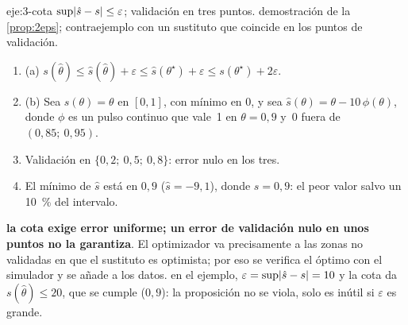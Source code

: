 \begin{solucion}{eje:3-cota}
\datos $\sup\lvert\hat s-s\rvert\le\varepsilon$; validación en tres puntos.
\planteamiento demostración de la \cref{prop:2eps}; contraejemplo con un sustituto que coincide en los puntos de validación.
\pasos
\begin{enumerate}[label=\arabic*.]
  \item (a) $s(\hat\theta)\le\hat s(\hat\theta)+\varepsilon\le\hat s(\theta^\star)+\varepsilon\le s(\theta^\star)+2\varepsilon$.
  \item (b) Sea $s(\theta)=\theta$ en $[0,1]$, con mínimo en $0$, y sea $\hat s(\theta)=\theta-10\,\phi(\theta)$, donde $\phi$ es un pulso continuo que vale~1 en $\theta=0{,}9$ y~0 fuera de $(0{,}85;\ 0{,}95)$.
  \item Validación en $\{0{,}2;\ 0{,}5;\ 0{,}8\}$: error nulo en los tres.
  \item El mínimo de $\hat s$ está en $0{,}9$ ($\hat s=-9{,}1$), donde $s=0{,}9$: el peor valor salvo un 10~\% del intervalo.
\end{enumerate}
\resultado \textbf{la cota exige error uniforme; un error de validación nulo en unos puntos no la garantiza}. El optimizador va precisamente a las zonas no validadas en que el sustituto es optimista; por eso se verifica el óptimo con el simulador y se añade a los datos.
\comprobacion en el ejemplo, $\varepsilon=\sup\lvert\hat s-s\rvert=10$ y la cota da $s(\hat\theta)\le 20$, que se cumple ($0{,}9$): la proposición no se viola, solo es inútil si $\varepsilon$ es grande.
\end{solucion}

